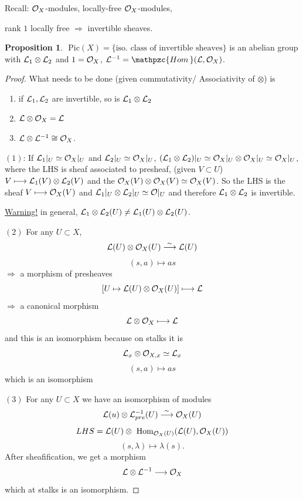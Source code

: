 \documentclass[11pt]{article}
\theoremstyle{definition}
\newtheorem{prop}[thm]{Proposition}
\renewcommand{\hom}{\text{ Hom}}
\newcommand{\phom}{\mathpzc{Hom\,}}
\newcommand{\pic}{\text{ Pic}}
\newcommand{\call}{{\cal L}}
\newcommand{\calo}{{\cal O}}
\newcommand{\Lrta}{\Longrightarrow}
\newcommand{\lrta}{\longrightarrow}
\begin{document}
Recall:
$\calo_X$-modules, locally-free $\calo_X$-modules,

rank $1$ locally free $\Lrta$ invertible sheaves.

\begin{prop}
$\pic(X)=\{\text{iso. class of  invertible sheaves}\}$ is an abelian group with $\call_1\otimes \call_2$
and $1=\calo_{X}$, $\call^{-1}=\phom(\call,\calo_X)$.
\end{prop}
\begin{proof}
What needs to be done (given commutativity/ Associativity of $\otimes$) is
\begin{enumerate}[label=(\arabic*)]
\item if $\call_1,\call_2$ are invertible, so is $\call_1\otimes \call_2$
\item $\call\otimes \calo_X=\call$
\item $\call\otimes \call^{-1}\cong \calo_X$.
\end{enumerate}

$(1)$: If $\call_1|_U\simeq \calo_X|_U$ and $\call_2|_U\simeq \calo_X|_U$,  $(\call_1\otimes\call_2)|_U\simeq \calo_X|_U\otimes\calo_X|_U\simeq \calo_X|_U$, where the LHS is sheaf associated to presheaf, (given $V\subset U$) $V\longmapsto\call_1(V)\otimes\call_2(V)$ and the $\calo_X(V)\otimes \calo_X(V)\simeq \calo_X(V)$. So the LHS is the sheaf $V\longmapsto \calo_X(V)$ and $\call_1|_U\otimes \call_2|_U\simeq \calo|_U$ and therefore $\call_1\otimes \call_2$ is invertible.

\underline{Warning!} in general, $\call_1\otimes \call_2(U)\neq\call_1(U)\otimes\call_2(U)$.

$(2)$ For any $U\subset X$, 
$$
\call(U)\otimes\calo_X(U)\overset{\sim}{\lrta}\call(U)
$$
$$
(s,a)\longmapsto as
$$
$\Lrta $ a morphism of presheaves 
$$
[U\mapsto \call(U)\otimes\calo_X(U)]\longmapsto \call
$$
$\Lrta$  a canonical morphism
$$
\call\otimes\calo_X\longmapsto \call
$$
and this is  an isomorphism because on stalks it is 
$$
\call_x\otimes \calo_{X,x}\simeq \call_x
$$
$$
(s,a)\longmapsto as
$$
which is an isomorphism

$(3)$ For any $U\subset X$ we have an isomorphism of modules
$$
\call(u)\otimes\call^{-1}_{pre}(U)\overset{\sim}{\lrta}\calo_X(U)
$$
$$
LHS=\call(U)\otimes\hom_{\calo_X(U)}(\call(U),\calo_X(U))
$$
$$
(s,\lambda)\longmapsto \lambda(s).
$$
After sheafification, we get a morphism
$$
\call\otimes\call^{-1}\lrta \calo_X
$$
which at stalks is an isomorphism.
\end{proof}
\end{document}
